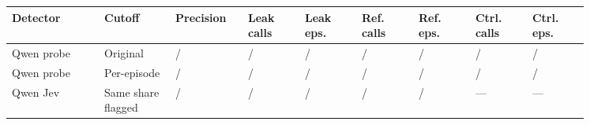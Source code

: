 \begin{tabular}{@{}>{\raggedright\arraybackslash}p{0.13\linewidth}>{\raggedright\arraybackslash}p{0.1\linewidth}>{\raggedright\arraybackslash}p{0.088\linewidth}>{\raggedright\arraybackslash}p{0.088\linewidth}>{\raggedright\arraybackslash}p{0.088\linewidth}>{\raggedright\arraybackslash}p{0.088\linewidth}>{\raggedright\arraybackslash}p{0.088\linewidth}>{\raggedright\arraybackslash}p{0.088\linewidth}>{\raggedright\arraybackslash}p{0.088\linewidth}@{}}
\toprule
Detector & Cutoff & Precision & Leak calls & Leak eps. & Ref. calls & Ref. eps. & Ctrl. calls & Ctrl. eps. \\
\midrule
Qwen probe & Original & \qwenCalibrationOriginalPrecisionNumerator{}/\qwenCalibrationOriginalPrecisionDenominator{} & \qwenCalibrationOriginalLeakCallsNumerator{}/\qwenCalibrationOriginalLeakCallsDenominator{} & \qwenCalibrationOriginalLeakEpisodesNumerator{}/\qwenCalibrationOriginalLeakEpisodesDenominator{} & \qwenCalibrationOriginalRefusingCallsNumerator{}/\qwenCalibrationOriginalRefusingCallsDenominator{} & \qwenCalibrationOriginalRefusingEpisodesNumerator{}/\qwenCalibrationOriginalRefusingEpisodesDenominator{} & \qwenCalibrationOriginalControlCallsNumerator{}/\qwenCalibrationOriginalControlCallsDenominator{} & \qwenCalibrationOriginalControlEpisodesNumerator{}/\qwenCalibrationOriginalControlEpisodesDenominator{} \\
Qwen probe & Per-episode & \qwenCalibrationEpisodePrecisionNumerator{}/\qwenCalibrationEpisodePrecisionDenominator{} & \qwenCalibrationEpisodeLeakCallsNumerator{}/\qwenCalibrationEpisodeLeakCallsDenominator{} & \qwenCalibrationEpisodeLeakEpisodesNumerator{}/\qwenCalibrationEpisodeLeakEpisodesDenominator{} & \qwenCalibrationEpisodeRefusingCallsNumerator{}/\qwenCalibrationEpisodeRefusingCallsDenominator{} & \qwenCalibrationEpisodeRefusingEpisodesNumerator{}/\qwenCalibrationEpisodeRefusingEpisodesDenominator{} & \qwenCalibrationEpisodeControlCallsNumerator{}/\qwenCalibrationEpisodeControlCallsDenominator{} & \qwenCalibrationEpisodeControlEpisodesNumerator{}/\qwenCalibrationEpisodeControlEpisodesDenominator{} \\
Qwen Jev & Same share flagged & \qwenJevCalibrationMatchedPrecisionNumerator{}/\qwenJevCalibrationMatchedPrecisionDenominator{} & \qwenJevCalibrationMatchedLeakCallsNumerator{}/\qwenJevCalibrationMatchedLeakCallsDenominator{} & \qwenJevCalibrationMatchedLeakEpisodesNumerator{}/\qwenJevCalibrationMatchedLeakEpisodesDenominator{} & \qwenJevCalibrationMatchedRefusingCallsNumerator{}/\qwenJevCalibrationMatchedRefusingCallsDenominator{} & \qwenJevCalibrationMatchedRefusingEpisodesNumerator{}/\qwenJevCalibrationMatchedRefusingEpisodesDenominator{} & --- & --- \\

\end{tabular}
